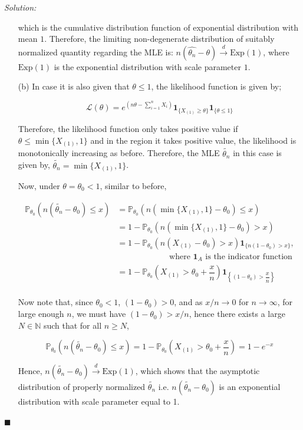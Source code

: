 \documentclass[12pt]{article}
\newcommand{\N}{\mathbb{N}}
\newcommand{\prob}{\mathbb{P}}
\theoremstyle{definition}
\newenvironment{answer}{\textit{Solution: }\quad }{ \hfill $\blacksquare$}
\numberwithin{equation}{section}
\begin{document}
\begin{answer}
\begin{enumerate}
        which is the cumulative distribution function of exponential distribution with mean $1$. Therefore, the limiting non-degenerate distribution of suitably normalized quantity regarding the MLE is: $n(\widehat{\theta_n} - \theta) \xrightarrow{d} \text{Exp}(1)$, where $\text{Exp}(1)$ is the exponential distribution with scale parameter $1$. 

        \item[(b)] In case it is also given that $\theta \leq 1$, the likelihood function is given by;
        
        $$\mathcal{L}(\theta) = e^{(n\theta - \sum_{i=1}^{n} X_i)} \bm{1}_{ \{X_{(1)} \geq \theta\} } \bm{1}_{ \{ \theta \leq 1 \} }$$

        Therefore, the likelihood function only takes positive value if $\theta \leq \min\{ X_{(1)}, 1\}$ and in the region it takes positive value, the likelihood is monotonically increasing as before. Therefore, the MLE $\widetilde{\theta_n}$ in this case is given by, $\widetilde{\theta_n} = \min\{ X_{(1)}, 1 \}$.

        Now, under $\theta = \theta_0 < 1$, similar to before,

        \begin{align*}
            \prob_{\theta_0}(n(\widetilde{\theta_n} - \theta_0) \leq x)
            & = \prob_{\theta_0}(n(\min\{X_{(1)}, 1 \} - \theta_0) \leq x)\\
            & = 1 - \prob_{\theta_0}\left(n(\min\{X_{(1)}, 1 \} - \theta_0) > x \right)\\
            & = 1 - \prob_{\theta_0}(n(X_{(1)} - \theta_0) > x) \bm{1}_{\{n(1 - \theta_0) > x\}}, \\
            & \qquad \qquad \qquad \text{ where } \bm{1}_A \text{ is the indicator function}\\
            & = 1 - \prob_{\theta_0}\left( X_{(1)} > \theta_0 + \dfrac{x}{n}\right) \bm{1}_{ \left\{(1 - \theta_0) > \dfrac{x}{n}\right\} }\\
        \end{align*}

        Now note that, since $\theta_0 < 1$, $(1 - \theta_0) > 0$, and as $x/n \rightarrow 0$ for $n \rightarrow \infty$, for large enough $n$, we must have $(1 - \theta_0) > x/n$, hence there exists a large $N \in \N$ such that for all $n \geq N$,

        $$\prob_{\theta_0}(n(\widetilde{\theta_n} - \theta_0) \leq x) = 1 - \prob_{\theta_0}\left( X_{(1)} > \theta_0 + \dfrac{x}{n}\right) = 1 - e^{-x}$$

        Hence, $n(\widetilde{\theta_n} - \theta_0) \xrightarrow{d} \text{Exp}(1)$, which shows that the asymptotic distribution of properly normalized $\widetilde{\theta_n}$ i.e. $n(\widetilde{\theta_n} - \theta_0)$ is an exponential distribution with scale parameter equal to 1.
    \end{enumerate}
\end{answer}
\end{document}
